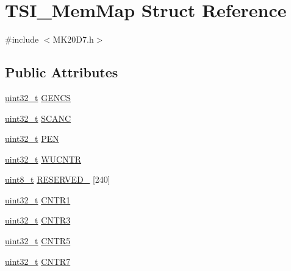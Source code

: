 \hypertarget{struct_t_s_i___mem_map}{}\section{T\+S\+I\+\_\+\+Mem\+Map Struct Reference}
\label{struct_t_s_i___mem_map}


{\ttfamily \#include $<$M\+K20\+D7.\+h$>$}

\subsection*{Public Attributes}
\begin{DoxyCompactItemize}
\item 
\hyperlink{_p_e___types_8h_a33594304e786b158f3fb30289278f5af}{uint32\+\_\+t} \hyperlink{struct_t_s_i___mem_map_a14380d508e161af3b794962e7c3f8abb}{G\+E\+N\+CS}
\item 
\hyperlink{_p_e___types_8h_a33594304e786b158f3fb30289278f5af}{uint32\+\_\+t} \hyperlink{struct_t_s_i___mem_map_abbf29c929817b57dbec256343e066a85}{S\+C\+A\+NC}
\item 
\hyperlink{_p_e___types_8h_a33594304e786b158f3fb30289278f5af}{uint32\+\_\+t} \hyperlink{struct_t_s_i___mem_map_a37c8a06461ca09948d6a65a1289bccd9}{P\+EN}
\item 
\hyperlink{_p_e___types_8h_a33594304e786b158f3fb30289278f5af}{uint32\+\_\+t} \hyperlink{struct_t_s_i___mem_map_ae36ce42bd55889c91be08af94a07203e}{W\+U\+C\+N\+TR}
\item 
\hyperlink{_p_e___types_8h_aba7bc1797add20fe3efdf37ced1182c5}{uint8\+\_\+t} \hyperlink{struct_t_s_i___mem_map_aecb4b24359c2124c89ec5472befbad8d}{R\+E\+S\+E\+R\+V\+E\+D\+\_} \mbox{[}240\mbox{]}
\item 
\hyperlink{_p_e___types_8h_a33594304e786b158f3fb30289278f5af}{uint32\+\_\+t} \hyperlink{struct_t_s_i___mem_map_a04fc03ca20b588fb20be9eee512fbfeb}{C\+N\+T\+R1}
\item 
\hyperlink{_p_e___types_8h_a33594304e786b158f3fb30289278f5af}{uint32\+\_\+t} \hyperlink{struct_t_s_i___mem_map_a6784d9dce99cc4d0e04e4e527513c525}{C\+N\+T\+R3}
\item 
\hyperlink{_p_e___types_8h_a33594304e786b158f3fb30289278f5af}{uint32\+\_\+t} \hyperlink{struct_t_s_i___mem_map_a16e7aed31d05ac2b570308c208471959}{C\+N\+T\+R5}
\item 
\hyperlink{_p_e___types_8h_a33594304e786b158f3fb30289278f5af}{uint32\+\_\+t} \hyperlink{struct_t_s_i___mem_map_a3c2f3ddd1d3725bef9e71fdf30a5ee8a}{C\+N\+T\+R7}

\end{DoxyCompactItemize}
